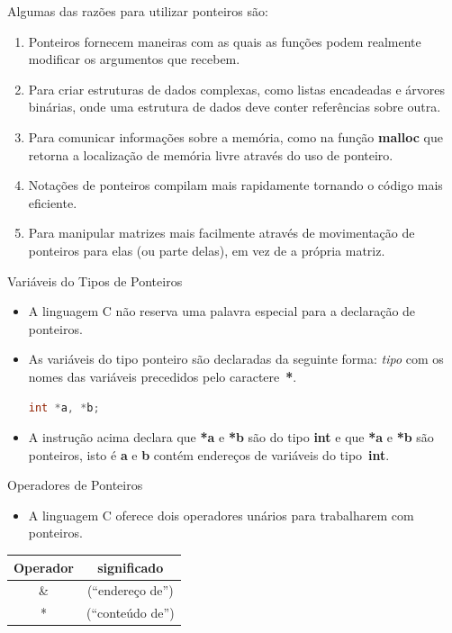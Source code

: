 \begin{frame}[c]{Algumas das razões para utilizar ponteiros são:}
\begin{enumerate}[<+->]
  \item Ponteiros fornecem maneiras com as quais as funções podem realmente modificar os argumentos que recebem.
  \item Para criar estruturas de dados complexas, como listas encadeadas e árvores binárias, onde uma estrutura de dados deve conter referências sobre outra.
  \item Para comunicar informações sobre a memória, como na função \textbf{malloc} que retorna a localização de memória livre através do uso de ponteiro.
  \item Notações de ponteiros compilam mais rapidamente tornando o código mais eficiente.
  \item Para manipular matrizes mais facilmente através de movimentação de ponteiros para elas (ou parte delas), em vez de a própria matriz.
\end{enumerate}
\end{frame}


\begin{frame}[fragile,c]{Variáveis do Tipos de Ponteiros}
  \begin{itemize}[<+->]
    \item A linguagem C não reserva uma palavra especial para a declaração de ponteiros.
    \item As variáveis do tipo ponteiro são declaradas da seguinte forma: \textit{tipo} com os nomes das variáveis precedidos pelo caractere~\textbf{*}.    
    \begin{lstlisting}[language=C]
    int *a, *b; 
        \end{lstlisting}
    \item A instrução acima declara que \textbf{*a} e \textbf{*b} são do tipo \textbf{int} e que \textbf{*a} e \textbf{*b} são ponteiros, isto é \textbf{a} e \textbf{b} contém endereços de variáveis do tipo~\textbf{int}.
  \end{itemize}
\end{frame}

\begin{frame}[fragile,c]{Operadores de Ponteiros}
  \begin{itemize}
    \item A linguagem C oferece dois operadores unários para trabalharem com ponteiros.
  \end{itemize}
  \begin{table}
     \begin{tabular}{c|c}
     \hline Operador & significado\\
      \hline \& & (``endereço de'')\\      
      \hline * & (``conteúdo de'')\\
      \hline 
     \end{tabular}
  \end{table}   
\end{frame}

